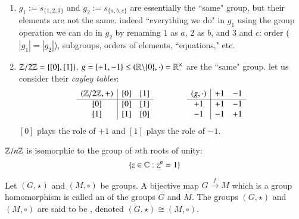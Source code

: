 \begin{example}
    \leavevmode
    \begin{enumerate}
        \item $g_1 := s_{\{1,2,3\}}$ and $g_2 := s_{\{a,b,c\}}$ are essentially the ``same" group, but their elements are not the same. indeed ``everything we do" in $g_1$ using the group operation we can do in $g_2$ by renaming $1$ as $a$, $2$ as $b$, and $3$ and $c$: order ($|g_1| = |g_2|$), subgroups, orders of elements, ``equations," etc.
        \item $\mathbb Z/2\mathbb Z = \{[0],[1]\}$, $g = \{+1,-1\} \leq (\mathbb R\backslash\{0\},\cdot) = \mathbb R^{\times}$ are the ``same" group. let us consider their \emph{cayley tables}:
        \begin{equation*}
            \begin{array}{c|cc}
                (\mathbb Z/2\mathbb Z,+) & [0] & {[1]}  \\ \hline
                {[0]} & [0] & {[1]} \\
                {[1]} & [1] & {[0]} \\
            \end{array}
            \hspace{40pt}
            \begin{array}{c|cc}
                (g, \cdot) & +1 & -1  \\ \hline
                +1 & +1 & -1 \\
                -1 & -1 & +1\\
            \end{array}
        \end{equation*}
        $[0]$ plays the role of $+1$ and $[1]$ plays the role of $-1$.
    \end{enumerate} 
\end{example}



\begin{proposition}
    $\mathbb Z/n\mathbb Z$ is isomorphic to the group of $n$th roots of unity: \begin{equation}
        \{z\in\mathbb C:z^n = 1\}
    \end{equation}
\end{proposition}

\begin{definition}
    Let $(G,\star)$ and $(M,\circ)$ be groups. A bijective map $G\xrightarrow{f} M$ which is a group homomorphism is called an  of the groups $G$ and $M$. The groups $(G,\star)$ and $(M,\circ)$ are said to be , denoted $(G,\star) \cong (M,\circ)$.
\end{definition}

